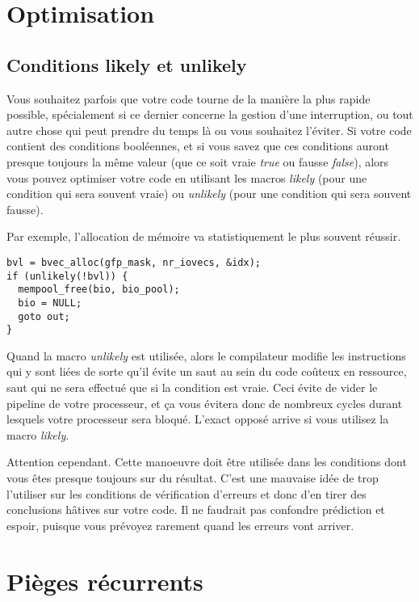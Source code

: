 \documentclass[11pt]{article}
\begin{document}
\section*{Optimisation}
\label{sec-18}

\subsection*{Conditions likely et unlikely}
\label{sec-18-1}

Vous souhaitez parfois que votre code tourne de la manière la plus rapide possible, spécialement si ce dernier concerne la gestion d'une interruption, ou tout autre chose qui peut prendre du temps là ou vous souhaitez l'éviter. Si votre code contient des conditions booléennes, et si vous savez que ces conditions auront presque toujours la même valeur (que ce soit vraie \emph{true} ou fausse \emph{false}), alors vous pouvez optimiser votre code en utilisant les macros \emph{likely} (pour une condition qui sera souvent vraie) ou \emph{unlikely} (pour une condition qui sera souvent fausse).

Par exemple, l'allocation de mémoire va statistiquement le plus souvent  réussir.

\begin{verbatim}
bvl = bvec_alloc(gfp_mask, nr_iovecs, &idx);
if (unlikely(!bvl)) {
  mempool_free(bio, bio_pool);
  bio = NULL;
  goto out;
}
\end{verbatim}

Quand la macro \emph{unlikely} est utilisée, alors le compilateur modifie les instructions qui y sont liées de sorte qu'il évite un saut au sein du code coûteux en ressource, saut qui ne sera effectué que si la condition est vraie. Ceci évite de vider le pipeline de votre processeur, et ça vous évitera donc de nombreux cycles durant lesquels votre processeur sera bloqué. L'exact opposé arrive si vous utilisez la macro \emph{likely}.

Attention cependant. Cette manoeuvre doit être utilisée dans les conditions dont vous êtes presque toujours sur du résultat. C'est une mauvaise idée de trop l'utiliser sur les conditions de vérification d'erreurs et donc d'en tirer des conclusions hâtives sur votre code. Il ne faudrait pas confondre prédiction et espoir, puisque vous prévoyez rarement quand les erreurs vont arriver.

\section*{Pièges récurrents}
\label{sec-19}
\end{document}
